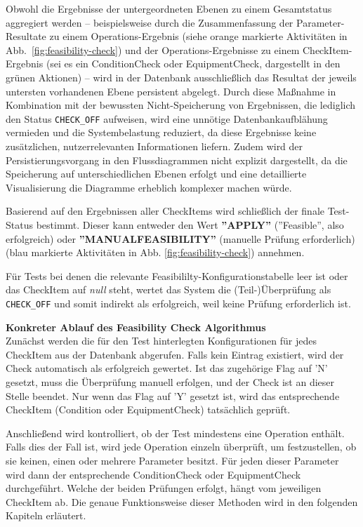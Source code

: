 Obwohl die Ergebnisse der untergeordneten Ebenen zu einem Gesamtstatus aggregiert werden – beispielsweise durch die Zusammenfassung der Parameter-Resultate zu einem Operations-Ergebnis (siehe orange markierte Aktivitäten in Abb. \ref{fig:feasibility-check}) und der Operations-Ergebnisse zu einem CheckItem-Ergebnis (sei es ein \gls{ConditionCheck} oder \gls{EquipmentCheck}, dargestellt in den grünen Aktionen) – wird in der Datenbank ausschließlich das Resultat der jeweils untersten vorhandenen Ebene persistent abgelegt. Durch diese Maßnahme in Kombination mit der bewussten Nicht-Speicherung von Ergebnissen, die lediglich den Status \texttt{CHECK\_OFF} aufweisen, wird eine unnötige Datenbankaufblähung vermieden und die Systembelastung reduziert, da diese Ergebnisse keine zusätzlichen, nutzerrelevanten Informationen liefern. Zudem wird der Persistierungsvorgang in den Flussdiagrammen nicht explizit dargestellt, da die Speicherung auf unterschiedlichen Ebenen erfolgt und eine detaillierte Visualisierung die Diagramme erheblich komplexer machen würde.

Basierend auf den Ergebnissen aller CheckItems wird schließlich der finale Test-Status bestimmt. Dieser kann entweder den Wert \textbf{''APPLY''} (''Feasible'', also erfolgreich) oder \textbf{''MANUALFEASIBILITY''} (manuelle Prüfung erforderlich) (blau markierte Aktivitäten in Abb. \ref{fig:feasibility-check}) annehmen.

Für Tests bei denen die relevante Feasibililty-Konfigurationstabelle leer ist oder das CheckItem auf \textit{null} steht, wertet das System die (Teil-)Überprüfung als \texttt{CHECK\_OFF} und somit indirekt als erfolgreich, weil keine Prüfung erforderlich ist.

\textbf{Konkreter Ablauf des Feasibility Check Algorithmus} \\
Zunächst werden die für den Test hinterlegten Konfigurationen für jedes CheckItem aus der Datenbank abgerufen. Falls kein Eintrag existiert, wird der Check automatisch als erfolgreich gewertet. Ist das zugehörige Flag auf 'N' gesetzt, muss die Überprüfung manuell erfolgen, und der Check ist an dieser Stelle beendet. Nur wenn das Flag auf 'Y' gesetzt ist, wird das entsprechende CheckItem (Condition oder \gls{EquipmentCheck}) tatsächlich geprüft.

Anschließend wird kontrolliert, ob der Test mindestens eine Operation enthält. Falls dies der Fall ist, wird jede Operation einzeln überprüft, um festzustellen, ob sie keinen, einen oder mehrere Parameter besitzt. Für jeden dieser Parameter wird dann der entsprechende \gls{ConditionCheck} oder \gls{EquipmentCheck} durchgeführt. Welche der beiden Prüfungen erfolgt, hängt vom jeweiligen CheckItem ab. Die genaue Funktionsweise dieser Methoden wird in den folgenden Kapiteln erläutert.


